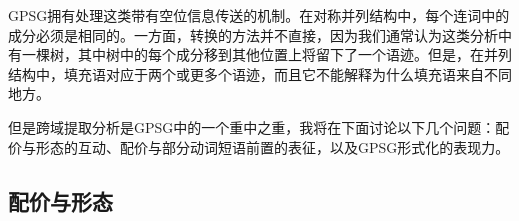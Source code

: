 \ex
[*]{
\gll The kennel (in) which Mary made and Fido sleeps has been stolen.\hspace{-2pt}\\
\textsc{det} 狗窝 \hspaceThis{(}\textsc{prep} \textsc{rel} Mary 做 和 Fido 睡觉 \textsc{aux} \passive{} 偷\\\jambox{(= S/NP \& S/PP)}
}
\zl
GPSG拥有处理这类带有空位信息传送的机制。在对称并列结构中，每个连词中的\slaschc 成分必须是相同的。一方面，转换的方法并不直接，因为我们通常认为这类分析中有一棵树，其中树中的每个成分移到其他位置上将留下了一个语迹。但是，在并列结构中，填充语对应于两个或更多个语迹，而且它不能解释为什么填充语来自不同地方。

但是跨域提取分析是GPSG中的一个重中之重，我将在下面讨论以下几个问题：配价与形态的互动、配价与部分动词短语前置的表征，以及GPSG形式化的表现力。

\subsection{配价与形态}

